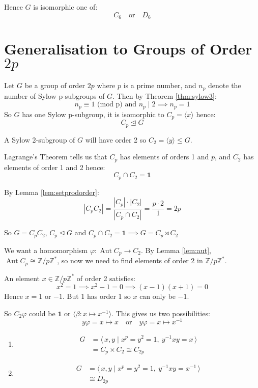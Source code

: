 \documentclass[a4paper, oneside, 12pt, final]{article}
\theoremstyle{definition}
\DeclareMathOperator{\Aut}{Aut}
\newcommand{\Z}{\mathbb{Z}}
\newcommand{\Zn}[1]{\Z/#1\Z}
\begin{document}
Hence \(G\) is isomorphic one of:
\[C_6 \quad \text{or} \quad D_6\]

\section{Generalisation to Groups of Order \(2p\)}
Let \(G\) be a group of order \(2p\) where \(p\) is a prime number, and \(n_p\)
denote the number of Sylow p-subgroups of \(G\).
Then by Theorem \ref{thm:sylow3}:
\[n_p \equiv 1 \text{ (mod p) and } n_p \mid 2 \implies n_p = 1\]
So \(G\) has one Sylow p-subgroup, it is isomorphic to \(C_p = \langle x
\rangle\) hence:
\[C_p \unlhd G\]

A Sylow 2-subgroup of \(G\) will have order 2 so \(C_2 = \langle y \rangle
\leqslant G\).

Lagrange's Theorem tells us that \(C_p\) has elements of orders 1 and \(p\),
and \(C_2\) has elements of order 1 and 2 hence:
\[C_p \cap C_2 = \bm{1}\]

By Lemma \ref{lem:setprodorder}:
\[|C_p C_2| = \frac{|C_p| \cdot |C_2|}{|C_p \cap C_2|} = \frac{p \cdot 2}{1} =
2p\]

So \(G = C_p C_2\), \(C_p \unlhd G\) and \(C_p \cap C_2 = \bm{1} \implies G =
C_p \rtimes C_2\)

We want a homomorphism \(\varphi:\Aut{C_p} \to C_2\).
By Lemma \ref{lem:aut}, \(\Aut{C_p} \cong \Zn{p}^*\), so now we need to find elements of order 2 in \(\Zn{p}^*\).

An element \(x \in \Zn{p}^*\) of order 2 satisfies:
\[x^2 = 1 \implies x^2 - 1 = 0 \implies (x-1)(x+1) = 0\]
Hence \(x = 1\) or \(-1\).
But 1 has order 1 so \(x\) can only be \(-1\).

So \(C_2\varphi\) could be \(\bm{1}\) or \(\langle \beta:x \mapsto x^{-1}
\rangle\). This gives us two possibilities:
\[y\varphi = x \mapsto x \quad \text{or} \quad y\varphi = x \mapsto x^{-1}\]

\begin{enumerate}
    \item
        \begin{equation*}
        \begin{aligned}
            G &= \langle\, x, y \mid x^p = y^2 = 1,\ y^{-1}xy = x \,\rangle \\
            &= C_p \times C_2 \cong C_{2p}
        \end{aligned}
        \end{equation*}
    \item
        \begin{equation*}
        \begin{aligned}
            G &= \langle\, x, y \mid x^p = y^2 = 1,\ y^{-1}xy = x^{-1}
            \,\rangle \\
            &\cong D_{2p}
        \end{aligned}
        \end{equation*}
\end{enumerate}
\end{document}
